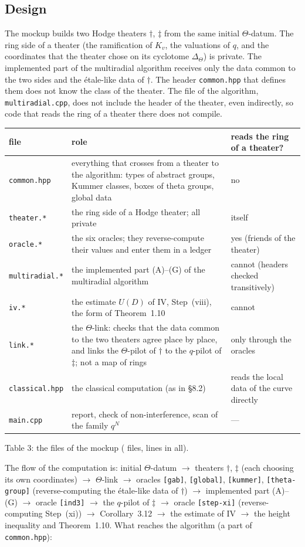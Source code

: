 \documentclass[11pt,a4paper]{article}
\newcommand{\orc}[1]{\texttt{[#1]}}
\newcommand{\lab}[2]{{\upshape\fcolorbox{#1}{#1!8}{\scriptsize\sffamily\bfseries\textcolor{#1}{#2}}}}
\newcommand{\tagP}{\lab{ForestGreen}{P}}
\begin{document}
\subsection{Design}
\tagP{} The mockup builds two Hodge theaters $\dagger$, $\ddagger$ from the same initial $\Theta$-datum. The ring side of
a theater (the ramification of $K_v$, the valuations of $q$, and the coordinates that the theater chose on its cyclotome
$\Delta_\Theta$) is private. The implemented part of the multiradial algorithm receives only the data common to the two
sides and the \'etale-like data of $\dagger$. The header \texttt{common.hpp} that defines them does not know the class of
the theater. The file of the algorithm, \texttt{multiradial.cpp}, does not include the header of the theater, even
indirectly, so code that reads the ring of a theater there does not compile.
\begin{center}\small
\begin{tabularx}{\textwidth}{@{}l X >{\raggedright\arraybackslash}p{3.6cm}@{}}
\toprule
file & role & reads the ring of a theater?\\
\midrule
\texttt{common.hpp} & everything that crosses from a theater to the algorithm: types of abstract groups, Kummer classes,
boxes of theta groups, global data & no\\
\texttt{theater.*} & the ring side of a Hodge theater; all private & itself\\
\texttt{oracle.*} & the six oracles; they reverse-compute their values and enter them in a ledger & yes (friends of the
theater)\\
\texttt{multiradial.*} & the implemented part (A)--(G) of the multiradial algorithm & cannot (headers checked
transitively)\\
\texttt{iv.*} & the estimate $U(D)$ of IV, Step~(viii), the form of Theorem~1.10 & cannot\\
\texttt{link.*} & the $\Theta$-link: checks that the data common to the two theaters agree place by place, and links
the $\Theta$-pilot of $\dagger$ to the $q$-pilot of $\ddagger$; not a map of rings & only through the oracles\\
\texttt{classical.hpp} & the classical computation (as in \S8.2) & reads the local data of the curve directly\\
\texttt{main.cpp} & report, check of non-interference, scan of the family $q^N$ & ---\\
\bottomrule
\end{tabularx}

\smallskip Table 3: the files of the mockup (\cppfiles{} files, \cpplines{} lines in all).
\end{center}
The flow of the computation is: initial $\Theta$-datum $\to$ theaters $\dagger$, $\ddagger$ (each choosing its own
coordinates) $\to$ $\Theta$-link $\to$ oracles \orc{gab}, \orc{global}, \orc{kummer}, \orc{theta-group}
(reverse-computing the \'etale-like data of $\dagger$) $\to$ implemented part (A)--(G) $\to$ oracle \orc{ind3} $\to$
the $q$-pilot of $\ddagger$ $\to$ oracle \orc{step-xi} (reverse-computing Step~(xi)) $\to$ Corollary~3.12 $\to$ the
estimate of IV $\to$ the height inequality and Theorem~1.10. What reaches the algorithm (a part of
\texttt{common.hpp}):
\cppbox
\end{document}
